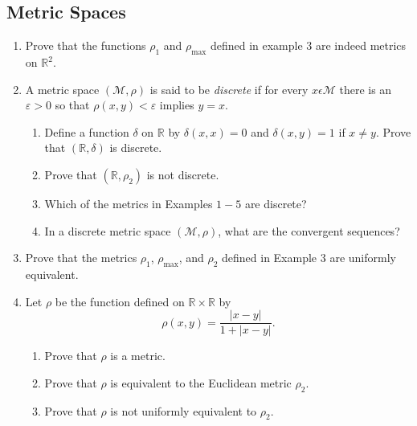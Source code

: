 \documentclass{article}
\begin{document}
\subsection{Metric Spaces}
\begin{enumerate}
      \item Prove that the functions $\rho_1$ and $\rho_{\max}$ defined in
            example 3 are indeed metrics on $\mathbb{R}^2$.
            \setcounter{enumi}{9}
      \item A metric space $(\mathcal{M}, \rho)$ is said to be \textit{discrete}
            if for every $x\epsilon\mathcal{M}$ there is an $\varepsilon>0$ so
            that $\rho(x, y)<\varepsilon$ implies $y=x$.
            \begin{enumerate}
                  \item Define a function $\delta$ on $\mathbb{R}$ by
                        $\delta(x,x)=0$ and $\delta(x, y)=1$ if $x\neq y$. Prove
                        that $(\mathbb{R}, \delta)$ is discrete.
                  \item Prove that $(\mathbb{R}, \rho_2)$ is not discrete.
                  \item Which of the metrics in Examples $1-5$ are discrete?
                  \item In a discrete metric space $(\mathcal{M}, \rho)$, what
                        are the convergent sequences?
            \end{enumerate}
            \setcounter{enumi}{11}
      \item Prove that the metrics $\rho_1$, $\rho_{\max}$, and $\rho_2$ defined
            in Example 3 are uniformly equivalent.
            \setcounter{enumi}{13}
      \item Let $\rho$ be the function defined on $\mathbb{R}\times\mathbb{R}$
            by
            \[
                  \rho(x, y) = \frac{\lvert x-y\rvert}{1+\lvert x-y\rvert}.
            \]
            \begin{enumerate}
                  \item Prove that $\rho$ is a metric.
                  \item Prove that $\rho$ is equivalent to the Euclidean
                        metric $\rho_2$.
                  \item Prove that $\rho$ is not uniformly equivalent to
                        $\rho_2$.
            \end{enumerate}
\end{enumerate}
\end{document}
